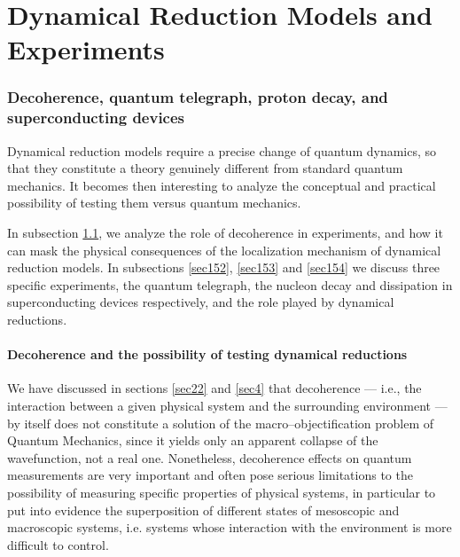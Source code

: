 \documentclass[12pt]{article}
\begin{document}
\newpage

\part{Dynamical Reduction Models and Experiments}

\section{Decoherence, quantum telegraph, proton decay, and
superconducting devices} \label{sec15}


Dynamical reduction models require a precise change of quantum
dynamics, so that they constitute a theory genuinely different
from standard quantum mechanics. It becomes then interesting to
analyze the conceptual and practical possibility of testing them
versus quantum mechanics.

In subsection \ref{sec151}, we analyze the role of decoherence in
experiments, and how it can mask the physical consequences of the
localization mechanism of dynamical reduction models. In
subsections \ref{sec152}, \ref{sec153} and  \ref{sec154} we
discuss three specific experiments, the quantum telegraph, the
nucleon decay and dissipation in superconducting devices
respectively, and the role played by dynamical reductions.


\subsection[Decoherence and dynamical reductions]{Decoherence and
the possibility of testing dynamical reductions} \label{sec151}

We have discussed in sections \ref{sec22} and \ref{sec4} that
decoherence --- i.e., the interaction between a given physical
system and the surrounding environment --- by itself does not
constitute a solution of the macro--objectification problem of
Quantum Mechanics, since it yields only an apparent collapse of
the wavefunction, not a real one. Nonetheless, decoherence effects
on quantum measurements are very important and often pose serious
limitations to the possibility of measuring specific properties of
physical systems, in particular to put into evidence the
superposition of different states of mesoscopic and macroscopic
systems, i.e. systems whose interaction with the environment is
more difficult to control.
\end{document}
